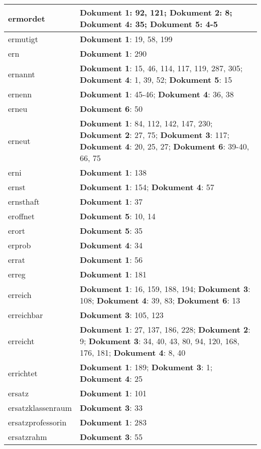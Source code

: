 \documentclass[a5paper]{article}
\begin{document}
\begin{longtable}[l]{|l|p{3in}|}
\hline
ermordet & \textbf{Dokument 1}: 92, 121; \textbf{Dokument 2}: 8; \textbf{Dokument 4}: 35; \textbf{Dokument 5}: 4-5 \\
\hline
ermutigt & \textbf{Dokument 1}: 19, 58, 199 \\
\hline
ern & \textbf{Dokument 1}: 290 \\
\hline
ernannt & \textbf{Dokument 1}: 15, 46, 114, 117, 119, 287, 305; \textbf{Dokument 4}: 1, 39, 52; \textbf{Dokument 5}: 15 \\
\hline
ernenn & \textbf{Dokument 1}: 45-46; \textbf{Dokument 4}: 36, 38 \\
\hline
erneu & \textbf{Dokument 6}: 50 \\
\hline
erneut & \textbf{Dokument 1}: 84, 112, 142, 147, 230; \textbf{Dokument 2}: 27, 75; \textbf{Dokument 3}: 117; \textbf{Dokument 4}: 20, 25, 27; \textbf{Dokument 6}: 39-40, 66, 75 \\
\hline
erni & \textbf{Dokument 1}: 138 \\
\hline
ernst & \textbf{Dokument 1}: 154; \textbf{Dokument 4}: 57 \\
\hline
ernsthaft & \textbf{Dokument 1}: 37 \\
\hline
eroffnet & \textbf{Dokument 5}: 10, 14 \\
\hline
erort & \textbf{Dokument 5}: 35 \\
\hline
erprob & \textbf{Dokument 4}: 34 \\
\hline
errat & \textbf{Dokument 1}: 56 \\
\hline
erreg & \textbf{Dokument 1}: 181 \\
\hline
erreich & \textbf{Dokument 1}: 16, 159, 188, 194; \textbf{Dokument 3}: 108; \textbf{Dokument 4}: 39, 83; \textbf{Dokument 6}: 13 \\
\hline
erreichbar & \textbf{Dokument 3}: 105, 123 \\
\hline
erreicht & \textbf{Dokument 1}: 27, 137, 186, 228; \textbf{Dokument 2}: 9; \textbf{Dokument 3}: 34, 40, 43, 80, 94, 120, 168, 176, 181; \textbf{Dokument 4}: 8, 40 \\
\hline
errichtet & \textbf{Dokument 1}: 189; \textbf{Dokument 3}: 1; \textbf{Dokument 4}: 25 \\
\hline
ersatz & \textbf{Dokument 1}: 101 \\
\hline
ersatzklassenraum & \textbf{Dokument 3}: 33 \\
\hline
ersatzprofessorin & \textbf{Dokument 1}: 283 \\
\hline
ersatzrahm & \textbf{Dokument 3}: 55 \\

\end{longtable}
\end{document}
